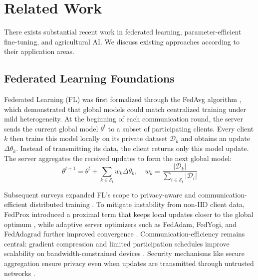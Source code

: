 \documentclass[10pt,journal,compsoc]{IEEEtran}
\begin{document}
\section{Related Work}
\label{sec:related}

There exists substantial recent work in federated learning, parameter-efficient fine-tuning, and agricultural AI. We discuss existing approaches according to their application areas.

\subsection{Federated Learning Foundations}

Federated Learning (FL) was first formalized through the FedAvg algorithm \cite{mcmahan2017communication}, which demonstrated that global models could match centralized training under mild heterogeneity. At the beginning of each communication round, the server sends the current global model $\theta^t$ to a subset of participating clients. Every client $k$ then trains this model locally on its private dataset $\mathcal{D}_k$ and obtains an update $\Delta\theta_k$. Instead of transmitting its data, the client returns only this model update. The server aggregates the received updates to form the next global model:
\begin{equation}
\theta^{t+1} = \theta^t + \sum_{k \in \mathcal{S}_t} w_k \Delta\theta_k, \quad w_k = \frac{|\mathcal{D}_k|}{\sum_{i \in \mathcal{S}_t} |\mathcal{D}_i|}
\end{equation}

Subsequent surveys expanded FL's scope to privacy-aware and communication-efficient distributed training \cite{yang2019federated}. To mitigate instability from non-IID client data, FedProx introduced a proximal term that keeps local updates closer to the global optimum \cite{li2020fedprox}, while adaptive server optimizers such as FedAdam, FedYogi, and FedAdagrad further improved convergence \cite{reddi2021adaptive}. Communication-efficiency remains central: gradient compression and limited participation schedules improve scalability on bandwidth-constrained devices \cite{konecny2016federated}. Security mechanisms like secure aggregation ensure privacy even when updates are transmitted through untrusted networks \cite{bonawitz2017practical}.
\end{document}
